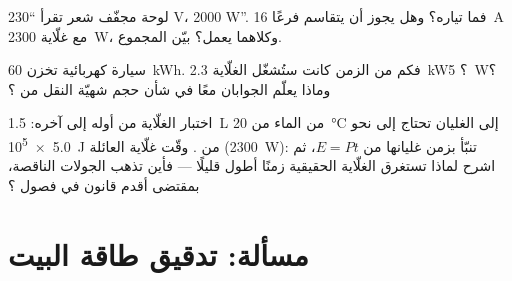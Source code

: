 \begin{exercise}[$\star\star$]\label{exo:g9:electric-power-energy:10}
لوحة مجفّف شعر تقرأ ``230 V، 2000 W''. فما تياره؟ وهل يجوز
أن يتقاسم فرعًا \qty{16}{A} مع غلّاية \qty{2300}{W}، وكلاهما
يعمل؟ بيّن المجموع.
\end{exercise}

\begin{exercise}[$\star\star$]\label{exo:g9:electric-power-energy:11}
 سيارة كهربائية تخزن \qty{60}{kWh}. فكم من الزمن كانت
ستُشغّل الغلّاية \qty{2.3}{kW}؟  \qty{5}{W}؟ وماذا
يعلّم الجوابان معًا في شأن حجم شهيّة النقل من ؟
\end{exercise}

\begin{exercise}[$\star\star\star$]\label{exo:g9:electric-power-energy:12}
اختبار الغلّاية من أوله إلى آخره: \qty{1.5}{L} من الماء من
\qty{20}{\celsius} إلى الغليان تحتاج إلى نحو \qty{5.0e5}{J}
من . وقّت غلّاية العائلة (\qty{2300}{W}): تنبّأ بزمن
غليانها من $E = P t$، ثم اشرح لماذا تستغرق الغلّاية الحقيقية
زمنًا أطول قليلًا --- فأين تذهب الجولات الناقصة، بمقتضى أقدم
قانون في فصول ؟
\end{exercise}

\section{مسألة: تدقيق طاقة البيت}


